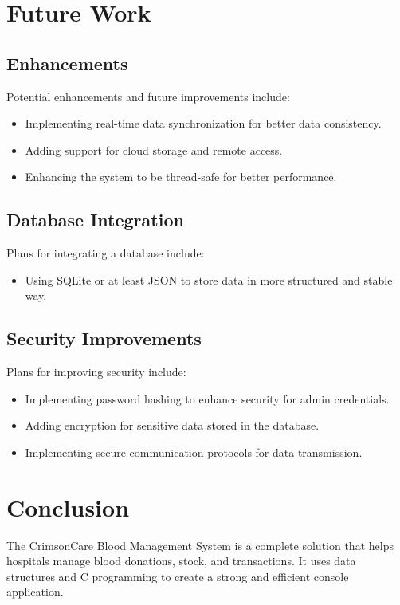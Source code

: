 \documentclass[12pt,a4paper]{report}
\begin{document}
\chapter{Future Work}

\section{Enhancements}
Potential enhancements and future improvements include:
\begin{itemize}
    \item Implementing real-time data synchronization for better data consistency.
    \item Adding support for cloud storage and remote access.
    \item Enhancing the system to be thread-safe for better performance.
\end{itemize}

\section{Database Integration}
Plans for integrating a database include:
\begin{itemize}
    \item Using SQLite or at least JSON to store data in more structured and stable way.
\end{itemize}

\section{Security Improvements}
Plans for improving security include:
\begin{itemize}
    \item Implementing password hashing to enhance security for admin credentials.
    \item Adding encryption for sensitive data stored in the database.
    \item Implementing secure communication protocols for data transmission.
\end{itemize}

\chapter{Conclusion}
The CrimsonCare Blood Management System is a complete solution that helps hospitals
manage blood donations, stock, and transactions. It uses data structures and
C programming to create a strong and efficient console application.
\end{document}
